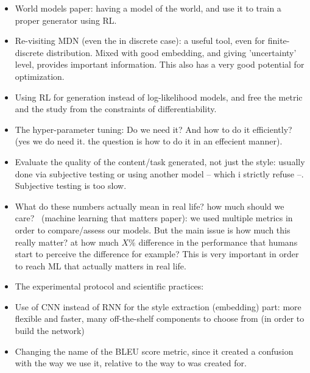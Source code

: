 \begin{itemize}
    \item World models paper: having a model of the world, and use it to train a proper generator using RL.

    \item Re-visiting MDN (even the in discrete case): a useful tool, even for finite-discrete distribution. Mixed with good embedding, and giving 'uncertainty' level, provides important information. This also has a very good potential for optimization.

    \item Using RL for generation instead of log-likelihood models, and free the metric and the study from the constraints of differentiability.
    \item The hyper-parameter tuning: Do we need it? And how to do it efficiently? (yes we do need it. the question is how to do it in an effecient manner).

    \item Evaluate the quality of the content/task generated, not just the style: usually done via subjective testing or using another model -- which i strictly refuse --. Subjective testing is too slow.

    \item What do these numbers actually mean in real life? how much should we care?~\citep{wagstaff2012machine} (machine learning that matters paper): we used multiple metrics in order to compare/assess our models. But the main issue is how much this really matter? at how much $X\%$ difference in the performance that humans start to perceive the difference for example? This is very important in order to reach ML that actually matters in real life.

    \item The experimental protocol and scientific practices:

    \item Use of CNN instead of RNN for the style extraction (embedding) part: more flexible and faster, many off-the-shelf components to choose from (in order to build the network)

    \item Changing the name of the BLEU score metric, since it created a confusion with the way we use it, relative to the way to was created for.
  \end{itemize}
